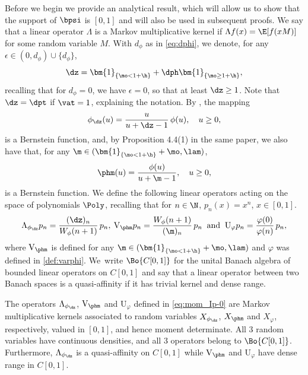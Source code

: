 Before we begin we provide an analytical result, which will allow us to show that the support of $\bpsi$ is $[0,1]$ and will also be used in subsequent proofs. We say that a linear operator $\Lambda$ is a Markov multiplicative kernel if $\Lambda f(x) = \E[f(xM)]$ for some random variable $M$. With $d_\phi$ as in \eqref{eq:dphi}, we denote, for any $\epsilon \in (0,d_\phi) \cup \{d_\phi\}$,
\begin{equation}
\label{eq:defn-d0}
\dz = \bm{1}_{\{ \mo < 1+\h \}} + \dph\bm{1}_{\{ \mo \geq 1+\h \}},
\end{equation}
recalling that for $d_\phi =0$, we have $\epsilon = 0$, so that at least $\dz \geq 1$. Note that $\dz=\dpt$ if $\vat=1$, explaining the notation. By \cite[Lem.\,10.3]{Patie-Savov-GeL}, the mapping
\begin{equation}
\label{eq:defphi-d0}
\phi_{\dz}(u)=\frac{u}{u+\dz-1}\,\phi(u), \quad u \ge 0,
\end{equation}
is a Bernstein function, and, by Proposition 4.4(1) in the same paper, we also have that, for
any $\m \in (\bm{1}_{\{\mo < 1+\h\}} + \mo, \lam)$,
\begin{equation}
\label{eq:def-phi-m}
\phm(u) = \frac{\phi(u)}{u+\m-1}, \quad u \ge 0,
\end{equation}
is a Bernstein function. We define the following linear operators acting on the space of polynomials $\Poly$, recalling
that for $n \in \N$, $p_n(x) = x^n$, $x \in [0,1]$.
\begin{equation}
\label{eq:mom_Ip-0}
\Lambda_{\phi_{\dz}}p_n = \frac{(\dz)_n}{W_\phi(n+1)}\,p_n, \:
\mathrm{V}_{\phm} p_n = \frac{W_{\phi}(n+1)}{(\m)_n}\,p_n \: \textrm{ and } \:
\mathrm{U}_\varphi p_n = \frac{\varphi(0)}{\varphi(n)}\,p_n,
\end{equation}
where $\mathrm{V}_{\phm}$ is defined for any $\m \in (\bm{1}_{\{\mo < 1+\h\}} + \mo, \lam)$ and $\varphi$ was defined in \eqref{def:varphi}. We~write $\Bo{C[0,1]}$ for the unital Banach algebra of bounded linear operators on $C[0,1]$ and say that a linear operator between two Banach spaces is a quasi-affinity if it has trivial kernel and dense range.

\begin{lemma}
\label{lem:Markov-kernel}
The operators $\Lambda_{\phi_{\dz}}$, $\mathrm{V}_{\phm}$ and $\mathrm{U}_{\varphi}$ defined in \eqref{eq:mom_Ip-0} are Markov multiplicative kernels associated to random variables $X_{\phi_{\dz}}$, $X_{\phm}$ and $X_{\varphi}$, respectively, valued in $[0,1]$, and hence moment determinate. All 3 random variables have continuous densities, and all 3 operators belong to $\Bo{C[0,1]}$. Furthermore, $\Lambda_{\phi_{\dz}}$ is a quasi-affinity on $C[0,1]$ while $\mathrm{V}_{\phm}$ and $\mathrm{U}_{\varphi}$ have dense range in $C[0,1]$.
\end{lemma}

